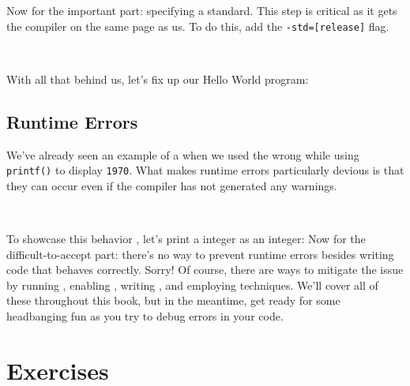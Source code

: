 Now for the important part: specifying a standard.  This step is
critical as it gets the compiler on the same page as us.  To do this,
add the \texttt{-std=[release]} flag.

\

\noindent
With all that behind us, let's fix up our Hello World program:

\subsection{Runtime Errors}

We've already seen an example of a  when we used
the wrong  while using \texttt{printf()}
to display \texttt{1970}.  What makes runtime errors particularly
devious is that they can occur even if the compiler has not generated
any warnings.

\

\noindent
To showcase this behavior , let's print a  integer as an
 integer:
\noindent
Now for the difficult-to-accept part: there's no way to prevent runtime
errors besides writing code that behaves correctly.  Sorry!  Of course,
there are ways to mitigate the issue by running , enabling , writing , and employing  techniques.  We'll
cover all of these throughout this book, but in the meantime, get ready
for some headbanging fun as you try to debug errors in your code.

\section{Exercises}

